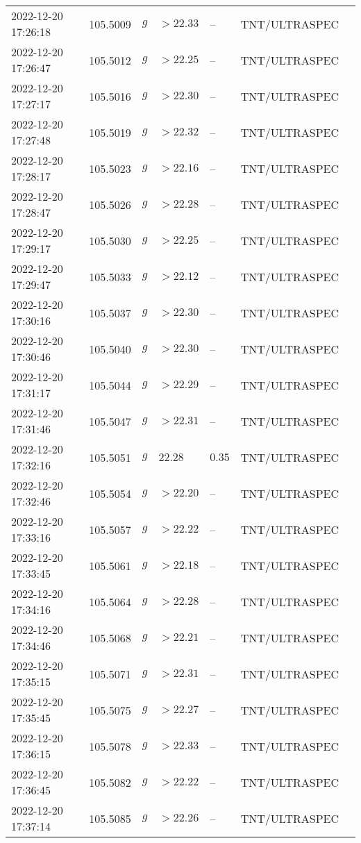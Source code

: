 \documentclass{nature_plusfigure}
\begin{document}
\begin{supplement}
\begin{center}
\begin{longtable}{lllllll}
2022-12-20 17:26:18 & 105.5009 & $g$ & $>22.33$ & -- & TNT/ULTRASPEC &  \\ 
2022-12-20 17:26:47 & 105.5012 & $g$ & $>22.25$ & -- & TNT/ULTRASPEC &  \\ 
2022-12-20 17:27:17 & 105.5016 & $g$ & $>22.30$ & -- & TNT/ULTRASPEC &  \\ 
2022-12-20 17:27:48 & 105.5019 & $g$ & $>22.32$ & -- & TNT/ULTRASPEC &  \\ 
2022-12-20 17:28:17 & 105.5023 & $g$ & $>22.16$ & -- & TNT/ULTRASPEC &  \\ 
2022-12-20 17:28:47 & 105.5026 & $g$ & $>22.28$ & -- & TNT/ULTRASPEC &  \\ 
2022-12-20 17:29:17 & 105.5030 & $g$ & $>22.25$ & -- & TNT/ULTRASPEC &  \\ 
2022-12-20 17:29:47 & 105.5033 & $g$ & $>22.12$ & -- & TNT/ULTRASPEC &  \\ 
2022-12-20 17:30:16 & 105.5037 & $g$ & $>22.30$ & -- & TNT/ULTRASPEC &  \\ 
2022-12-20 17:30:46 & 105.5040 & $g$ & $>22.30$ & -- & TNT/ULTRASPEC &  \\ 
2022-12-20 17:31:17 & 105.5044 & $g$ & $>22.29$ & -- & TNT/ULTRASPEC &  \\ 
2022-12-20 17:31:46 & 105.5047 & $g$ & $>22.31$ & -- & TNT/ULTRASPEC &  \\ 
2022-12-20 17:32:16 & 105.5051 & $g$ & $22.28$ & $0.35$ & TNT/ULTRASPEC &  \\ 
2022-12-20 17:32:46 & 105.5054 & $g$ & $>22.20$ & -- & TNT/ULTRASPEC &  \\ 
2022-12-20 17:33:16 & 105.5057 & $g$ & $>22.22$ & -- & TNT/ULTRASPEC &  \\ 
2022-12-20 17:33:45 & 105.5061 & $g$ & $>22.18$ & -- & TNT/ULTRASPEC &  \\ 
2022-12-20 17:34:16 & 105.5064 & $g$ & $>22.28$ & -- & TNT/ULTRASPEC &  \\ 
2022-12-20 17:34:46 & 105.5068 & $g$ & $>22.21$ & -- & TNT/ULTRASPEC &  \\ 
2022-12-20 17:35:15 & 105.5071 & $g$ & $>22.31$ & -- & TNT/ULTRASPEC &  \\ 
2022-12-20 17:35:45 & 105.5075 & $g$ & $>22.27$ & -- & TNT/ULTRASPEC &  \\ 
2022-12-20 17:36:15 & 105.5078 & $g$ & $>22.33$ & -- & TNT/ULTRASPEC &  \\ 
2022-12-20 17:36:45 & 105.5082 & $g$ & $>22.22$ & -- & TNT/ULTRASPEC &  \\ 
2022-12-20 17:37:14 & 105.5085 & $g$ & $>22.26$ & -- & TNT/ULTRASPEC &  \\ 

\end{longtable}
\end{center}
\end{supplement}
\end{document}
